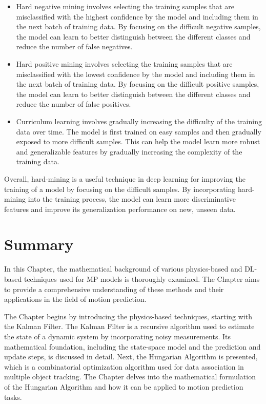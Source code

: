 \begin{itemize}
	\item Hard negative mining involves selecting the training samples that are misclassified with the highest confidence by the model and including them in the next batch of training data. By focusing on the difficult negative samples, the model can learn to better distinguish between the different classes and reduce the number of false negatives.
	
	\item Hard positive mining involves selecting the training samples that are misclassified with the lowest confidence by the model and including them in the next batch of training data. By focusing on the difficult positive samples, the model can learn to better distinguish between the different classes and reduce the number of false positives.
	
	\item Curriculum learning involves gradually increasing the difficulty of the training data over time. The model is first trained on easy samples and then gradually exposed to more difficult samples. This can help the model learn more robust and generalizable features by gradually increasing the complexity of the training data.

\end{itemize}

Overall, hard-mining is a useful technique in deep learning for improving the training of a model by focusing on the difficult samples. By incorporating hard-mining into the training process, the model can learn more discriminative features and improve its generalization performance on new, unseen data.

\section{Summary}
\label{sec:3_summary}

In this Chapter, the mathematical background of various physics-based and \ac{DL}-based techniques used for \ac{MP} models is thoroughly examined. The Chapter aims to provide a comprehensive understanding of these methods and their applications in the field of motion prediction.

The Chapter begins by introducing the physics-based techniques, starting with the Kalman Filter. The Kalman Filter is a recursive algorithm used to estimate the state of a dynamic system by incorporating noisy measurements. Its mathematical foundation, including the state-space model and the prediction and update steps, is discussed in detail. Next, the Hungarian Algorithm is presented, which is a combinatorial optimization algorithm used for data association in multiple object tracking. The Chapter delves into the mathematical formulation of the Hungarian Algorithm and how it can be applied to motion prediction tasks.

